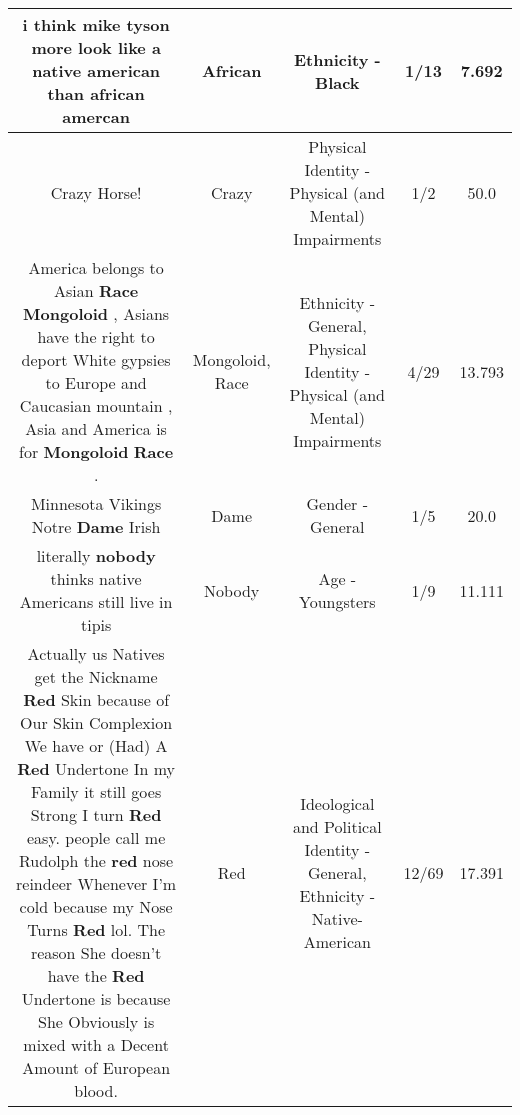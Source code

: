 \documentclass[11pt]{article}
\newlength\mylength
\begin{document}
\begin{center}
\begin{longtable}{|C{.65\mylength}|C{.30\mylength}|C{.12\mylength}|C{.12\mylength}|C{.12\mylength}|}
  \small i think mike tyson more look like a native american than \textbf{african} amercan\normalsize   & African & Ethnicity - Black & 1/13 & 7.692 \\  \hline
  \small Crazy Horse!\normalsize   & Crazy & Physical Identity - Physical (and Mental) Impairments & 1/2 & 50.0 \\  \hline
  \small America belongs to Asian \textbf{Race} \textbf{Mongoloid} , Asians have the right to deport White gypsies to Europe and Caucasian mountain , Asia and America is for \textbf{Mongoloid} \textbf{Race} .\normalsize   & Mongoloid, Race & Ethnicity - General, Physical Identity - Physical (and Mental) Impairments & 4/29 & 13.793 \\  \hline
  \small Minnesota Vikings Notre \textbf{Dame} Irish\normalsize   & Dame & Gender - General & 1/5 & 20.0 \\  \hline
  \small literally \textbf{nobody} thinks native Americans still live in tipis\normalsize   & Nobody & Age - Youngsters & 1/9 & 11.111 \\  \hline
  \small Actually us Natives get the Nickname \textbf{R\textbf{ed}} Skin because of Our Skin Complexion We have or (Had) A \textbf{R\textbf{ed}} Undertone In my Family it still goes Strong I turn \textbf{R\textbf{ed}} easy. people call me Rudolph the \textbf{r\textbf{ed}} nose reindeer Whenever I'm cold because my Nose Turns \textbf{R\textbf{ed}} lol. The reason She doesn't have the \textbf{R\textbf{ed}} Undertone is because She Obviously is mixed with a Decent Amount of European blood.\normalsize   & Red &  Ideological and Political Identity - General, Ethnicity - Native-American & 12/69 & 17.391 \\  \hline

\end{longtable}
\end{center}
\end{document}
